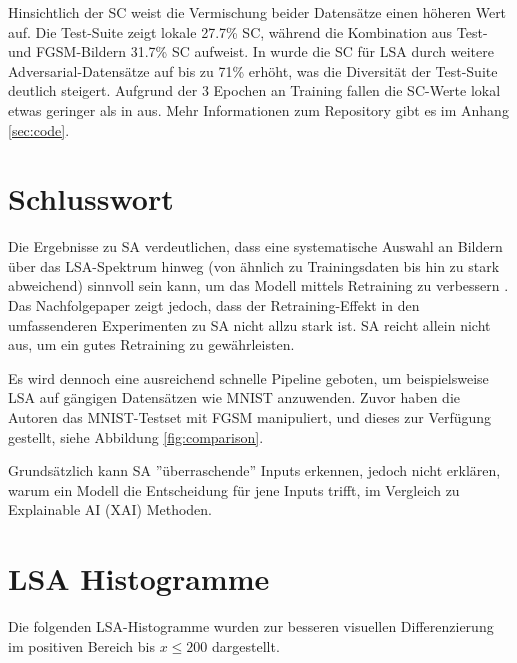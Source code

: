 \documentclass[sigconf, natbib=false]{acmart}
\begin{document}
Hinsichtlich der SC weist die Vermischung beider Datensätze einen höheren Wert auf. Die Test-Suite zeigt lokale 27.7\% SC, während die Kombination aus Test- und FGSM-Bildern 31.7\% SC aufweist. In \cite{sa_2} wurde die SC für LSA durch weitere Adversarial-Datensätze auf bis zu 71\% erhöht, was die Diversität der Test-Suite deutlich steigert. Aufgrund der 3 Epochen an Training fallen die SC-Werte lokal etwas geringer als in \cite{sa_1} aus. Mehr Informationen zum Repository gibt es im Anhang \ref{sec:code}.

\section{Schlusswort}
Die Ergebnisse zu SA verdeutlichen, dass eine systematische Auswahl an Bildern über das LSA-Spektrum hinweg (von ähnlich zu Trainingsdaten bis hin zu stark abweichend) sinnvoll sein kann, um das Modell mittels Retraining zu verbessern \cite{sa_1}. Das Nachfolgepaper \cite{sa_2} zeigt jedoch, dass der Retraining-Effekt in den umfassenderen Experimenten zu SA nicht allzu stark ist. SA reicht allein nicht aus, um ein gutes Retraining zu gewährleisten.

Es wird dennoch eine ausreichend schnelle Pipeline geboten, um beispielsweise LSA auf gängigen Datensätzen wie MNIST anzuwenden. Zuvor haben die Autoren das MNIST-Testset mit FGSM manipuliert, und dieses zur Verfügung gestellt, siehe Abbildung \ref{fig:comparison}.

Grundsätzlich kann SA ''überraschende'' Inputs erkennen, jedoch nicht erklären, warum ein Modell die Entscheidung für jene Inputs trifft, im Vergleich zu Explainable AI (XAI) Methoden. 

\pagebreak
\appendix
\setcounter{figure}{0}
\renewcommand{\thefigure}{\thesection.\arabic{figure}}

\section{LSA Histogramme}

Die folgenden LSA-Histogramme wurden zur besseren visuellen Differenzierung im positiven Bereich bis $x \leq 200$ dargestellt.
\end{document}
